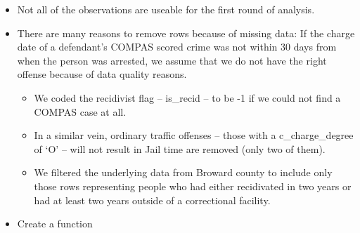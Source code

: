 \documentclass[
]{book}
\providecommand{\tightlist}{%
  \setlength{\itemsep}{0pt}\setlength{\parskip}{0pt}}
\begin{document}
\begin{itemize}
\tightlist
\item
  Not all of the observations are useable for the first round of analysis.
\item
  There are many reasons to remove rows because of missing data:
  If the charge date of a defendant's COMPAS scored crime was not within 30 days from when the person was arrested, we assume that we do not have the right offense because of data quality reasons.

  \begin{itemize}
  \tightlist
  \item
    We coded the recidivist flag -- is\_recid -- to be -1 if we could not find a COMPAS case at all.
  \item
    In a similar vein, ordinary traffic offenses -- those with a c\_charge\_degree of `O' -- will not result in Jail time are removed (only two of them).
  \item
    We filtered the underlying data from Broward county to include only those rows representing people who had either recidivated in two years or had at least two years outside of a correctional facility.
  \end{itemize}
\item
  Create a function
\end{itemize}
\end{document}
